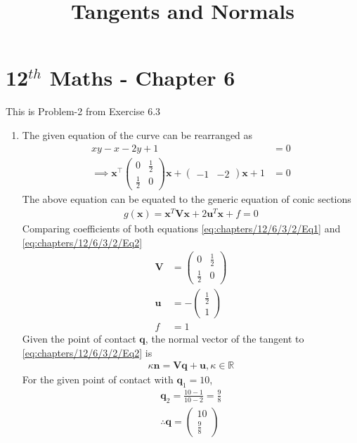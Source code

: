 \documentclass[12pt]{article}
\providecommand{\brak}[1]{\ensuremath{\left(#1\right)}}
\newcommand{\myvec}[1]{\ensuremath{\begin{pmatrix}#1\end{pmatrix}}}
\let\vec\mathbf
\begin{document}
\begin{center}
\title{\textbf{Tangents and Normals}}
\date{\vspace{-5ex}} %
\maketitle
\end{center}
\setcounter{page}{1}

\section{12$^{th}$ Maths - Chapter 6}
This is Problem-2 from Exercise 6.3 
\begin{enumerate}
\fi
\begin{enumerate}
\item The given equation of the curve can be rearranged as
\begin{align}
	xy-x-2y+1 &= 0 \\
        \label{eq:chapters/12/6/3/2/Eq1}
	\implies \vec{x}^\top\myvec{0 & \frac{1}{2} \\ \frac{1}{2} & 0}\vec{x} + \myvec{-1 & -2}\vec{x}+1 &= 0 
\end{align}
The above equation can be equated to the generic equation of conic sections
\begin{align}
	\label{eq:chapters/12/6/3/2/Eq2}
	g\brak{\vec{x}} = \vec{x}^T\vec{V}\vec{x} + 2\vec{u}^T\vec{x} + f = 0 
\end{align}
Comparing coefficients of both equations \eqref{eq:chapters/12/6/3/2/Eq1} and \eqref{eq:chapters/12/6/3/2/Eq2} 
\begin{align}
	\vec{V} &= \myvec{ 0 & \frac{1}{2} \\ \frac{1}{2} & 0} \\
	\vec{u} &= -\myvec{\frac{1}{2} \\ 1} \\
	f &= 1 
\end{align}
Given the point of contact $\vec{q}$, the normal vector of the tangent to \eqref{eq:chapters/12/6/3/2/Eq2} is
\begin{align}
	\label{eq:chapters/12/6/3/2/Eq3}
        \kappa \vec{n} = \vec{V}\vec{q}+\vec{u}, \kappa \in \mathbb{R}
\end{align}
For the given point of contact with $\vec{q}_1=10$,
\begin{align}
	\vec{q}_2 = \frac{10-1}{10-2} = \frac{9}{8} \\
	 \therefore \vec{q} = \myvec{10 \\ \frac{9}{8}}

\end{align}
\end{enumerate}
\end{enumerate}
\end{document}
